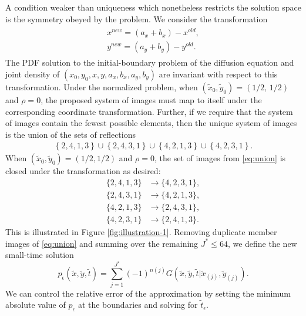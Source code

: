 A condition weaker than uniqueness which nonetheless restricts the
solution space is the symmetry obeyed by the problem. We consider the transformation
\begin{align}
  \label{eq:symmetry-condition}
  \begin{split}
    x^{new} = (a_x + b_x) - x^{old}, \\
    y^{new} = (a_y + b_y) - y^{old}.
  \end{split}
\end{align}
The PDF solution to the initial-boundary problem of the diffusion
equation and joint density of $(x_0,y_0,x,y,a_x,b_x,a_y,b_y)$ are
invariant with respect to this transformation. Under the normalized
problem, when $(\tilde{x}_0, \tilde{y}_0) = (1/2,\,1/2)$ and $\rho=0$,
the proposed system of images must map to itself under the
corresponding coordinate transformation. Further, if we require that
the system of images contain the fewest possible elements, then the
unique system of images is the union of the sets of reflections
\begin{align}
  \left\{ 2,4,1,3 \right\} \cup \left\{ 2,4,3,1 \right\} \cup \left\{ 4,2,1,3 \right\} \cup \left\{ 4,2,3,1 \right\}. \label{eq:union}
\end{align}
When $(\tilde{x}_0, \tilde{y}_0) = (1/2,1/2)$ and $\rho=0$, the set of
images from \eqref{eq:union} is closed under the transformation as
desired:
\begin{align*}
  \{2,4,1,3 \} &\to \{4,2,3,1 \}, \\
  \{2,4,3,1 \} &\to \{4,2,1,3 \}, \\
  \{4,2,1,3 \} &\to \{2,4,3,1 \}, \\
  \{4,2,3,1 \} &\to \{2,4,1,3 \}.
\end{align*}
This is illustrated in Figure \ref{fig:illustration-1}. Removing
duplicate member images of \eqref{eq:union} and summing over the
remaining $J^* \leq 64$, we define the new small-time solution
\begin{equation}
  p_\epsilon(\tilde{x}, \tilde{y}, \tilde{t}) = \sum_{j=1}^{J^*} (-1)^{n(j)}
  G(\tilde{x},\tilde{y},\tilde{t}|\tilde{x}_{(j)},\tilde{y}_{(j)}). \label{eq:small-time-sol}
\end{equation}
We can control the relative error of the approximation by setting the
minimum absolute value of $p_\epsilon$ at the boundaries and solving
for $\tilde{t}_\epsilon$.
